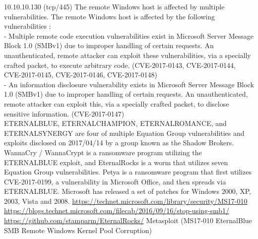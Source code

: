 \begin{tcolorbox}[
	title=MS17-010: Security Update for Microsoft Windows SMB Server (4013389) (ETERNALBLUE) (ETERNALCHAMPION) (ETERNALROMANCE) (ETERNALSYNERGY) (WannaCry) (EternalRocks) (Petya) (uncredentialed check) - Nessus Plugin ID 97833,
	colback=red!5!white,
	colframe=red!75!black,
	subtitle style={boxrule=0.4pt, colback=red!50!white}	
	] 
	10.10.10.130 (tcp/445)
The remote Windows host is affected by multiple vulnerabilities.
The remote Windows host is affected by the following vulnerabilities :\\
- Multiple remote code execution vulnerabilities exist in Microsoft Server Message Block 1.0 (SMBv1) due to improper handling of certain requests. An unauthenticated, remote attacker can exploit these vulnerabilities, via a specially crafted packet, to execute arbitrary code. (CVE-2017-0143, CVE-2017-0144, CVE-2017-0145, CVE-2017-0146, CVE-2017-0148)\\
- An information disclosure vulnerability exists in Microsoft Server Message Block 1.0 (SMBv1) due to improper handling of certain requests. An unauthenticated, remote attacker can exploit this, via a specially crafted packet, to disclose sensitive information. (CVE-2017-0147)\\
ETERNALBLUE, ETERNALCHAMPION, ETERNALROMANCE, and ETERNALSYNERGY are four of multiple Equation Group vulnerabilities and exploits disclosed on 2017/04/14 by a group known as the Shadow Brokers. WannaCry / WannaCrypt is a ransomware program utilizing the ETERNALBLUE exploit, and EternalRocks is a worm that utilizes seven Equation Group vulnerabilities. Petya is a ransomware program that first utilizes CVE-2017-0199, a vulnerability in Microsoft Office, and then spreads via ETERNALBLUE.
Microsoft has released a set of patches for Windows 2000, XP, 2003, Vista and 2008.
\url{https://technet.microsoft.com/library/security/MS17-010}\\
\url{https://blogs.technet.microsoft.com/filecab/2016/09/16/stop-using-smb1/}\\
\url{https://github.com/stamparm/EternalRocks/}
Metasploit (MS17-010 EternalBlue SMB Remote Windows Kernel Pool Corruption) 
\end{tcolorbox}
